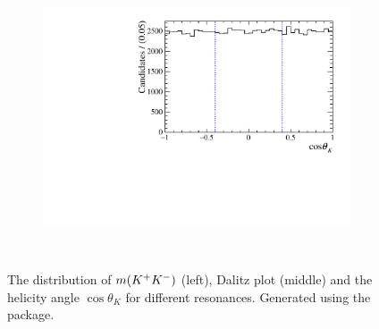 \begin{figure}[!ht]
\begin{subfigure}[t]{0.32\textwidth}
        \includegraphics[width=1.0\textwidth]{figs/B2DsPhi/a0_Helicity.pdf}
    \end{subfigure}\\ 

    \caption{The distribution of $m({{K}^+}{{K}^-})$ (left), Dalitz plot (middle) and the helicity angle $\cos\theta_{K}$ for different resonances. Generated using the \laurapp package.} 
    \label{fig:models_one}   
\end{figure}


